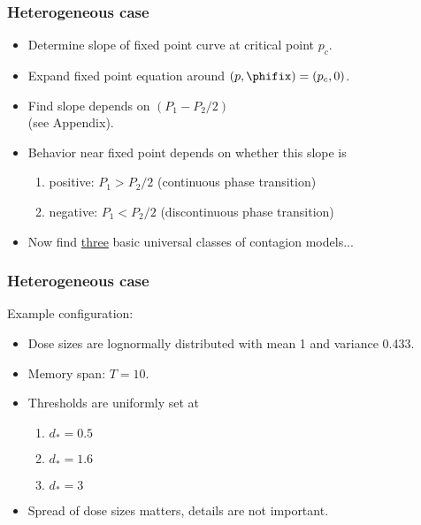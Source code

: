 \begin{frame}
  \frametitle{Heterogeneous case}

  \begin{itemize}
  \item<1->
     Determine slope of fixed point curve at 
    critical point $p_c$.
  \item<2->
    Expand fixed point equation around $(p,\phifix) = (p_c,0)$.
  \item<3->
    Find slope depends on $(P_1 - P_2/2)$\cite{dodds2005a}\\
    (see Appendix).
  \item<4->
    Behavior near fixed point depends on whether
    this slope is
    \begin{enumerate}
    \item<5->
      positive: $P_1>P_2/2$ (continuous phase transition)
    \item<6->
      negative: $P_1<P_2/2$ (discontinuous phase transition)
    \end{enumerate}
  \item<7->
    Now find \underline{\alert{three}} 
    basic universal classes
    of contagion models...
  \end{itemize}

\end{frame}

\begin{frame}
  \frametitle{Heterogeneous case}

  \begin{block}{Example configuration:}
    \begin{itemize}
    \item<1-> Dose sizes are lognormally distributed with mean 1
      and variance 0.433.
    \item<2-> Memory span: $T = 10$.
    \item<3-> Thresholds are uniformly set at 
      \begin{enumerate}
      \item<3-> $d_\ast = 0.5$
      \item<3-> $d_\ast = 1.6$
      \item<3-> $d_\ast = 3$
      \end{enumerate}
    \item<4-> Spread of dose sizes matters, details are not important.
    \end{itemize}
  \end{block}

\end{frame} 

